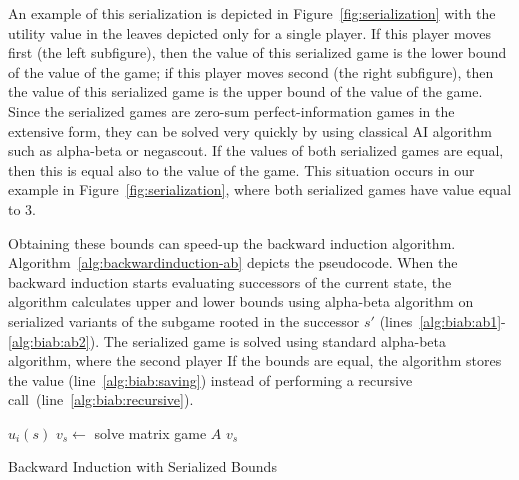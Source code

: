 An example of this serialization is depicted in Figure~\ref{fig:serialization} with the utility value in the leaves depicted only for a single player. 
If this player moves first (the left subfigure), then the value of this serialized game is the lower bound of the value of the game; if this player moves second (the right subfigure), then the value of this serialized game is the upper bound of the value of the game.
Since the serialized games are zero-sum perfect-information games in the extensive form, they can be solved very quickly by using classical AI algorithm such as alpha-beta or negascout.
If the values of both serialized games are equal, then this is equal also to the value of the game. This situation occurs in our example in Figure~\ref{fig:serialization}, where both serialized games have value equal to $3$.

Obtaining these bounds can speed-up the backward induction algorithm. 
Algorithm~\ref{alg:backwardinduction-ab} depicts the pseudocode.
When the backward induction starts evaluating successors of the current state, the algorithm calculates upper and lower bounds using alpha-beta algorithm on serialized variants of the subgame rooted in the successor $s'$ (lines~\ref{alg:biab:ab1}-\ref{alg:biab:ab2}). The serialized game is solved using standard alpha-beta algorithm, where the second player 
If the bounds are equal, the algorithm stores the value (line~\ref{alg:biab:saving}) instead of performing a recursive call~(line~\ref{alg:biab:recursive}).

\begin{algorithm2e}[t]
\small
{}
 {\Return $u_i(s)$} \label{alg:biab:stop1}
$v_s \leftarrow$ solve matrix game $A$\;
\Return $v_s$ \label{alg:biab:stop2}
\caption{Backward Induction with Serialized Bounds}\label{alg:backwardinduction-ab}
\end{algorithm2e}

